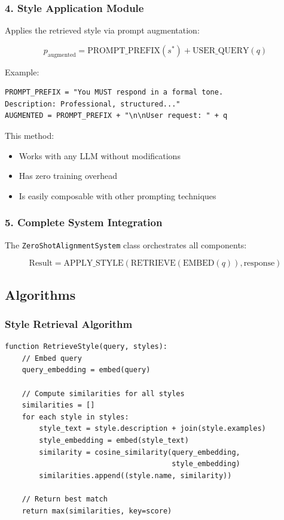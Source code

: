\documentclass[11pt,a4paper]{article}
\begin{document}
\subsubsection{4. Style Application Module}

Applies the retrieved style via prompt augmentation:

\begin{equation}
p_{\text{augmented}} = \text{PROMPT\_PREFIX}(s^*) + \text{USER\_QUERY}(q)
\end{equation}

Example:
\begin{lstlisting}
PROMPT_PREFIX = "You MUST respond in a formal tone. 
Description: Professional, structured..."
AUGMENTED = PROMPT_PREFIX + "\n\nUser request: " + q
\end{lstlisting}

This method:
\begin{itemize}
    \item Works with any LLM without modifications
    \item Has zero training overhead
    \item Is easily composable with other prompting techniques
\end{itemize}

\subsubsection{5. Complete System Integration}

The \texttt{ZeroShotAlignmentSystem} class orchestrates all components:

\begin{equation}
\text{Result} = \text{APPLY\_STYLE}(\text{RETRIEVE}(\text{EMBED}(q)), \text{response})
\end{equation}

\subsection{Algorithms}

\subsubsection{Style Retrieval Algorithm}

\begin{lstlisting}[caption={Style Retrieval Algorithm}]
function RetrieveStyle(query, styles):
    // Embed query
    query_embedding = embed(query)
    
    // Compute similarities for all styles
    similarities = []
    for each style in styles:
        style_text = style.description + join(style.examples)
        style_embedding = embed(style_text)
        similarity = cosine_similarity(query_embedding, 
                                       style_embedding)
        similarities.append((style.name, similarity))
    
    // Return best match
    return max(similarities, key=score)
\end{lstlisting}
\end{document}
